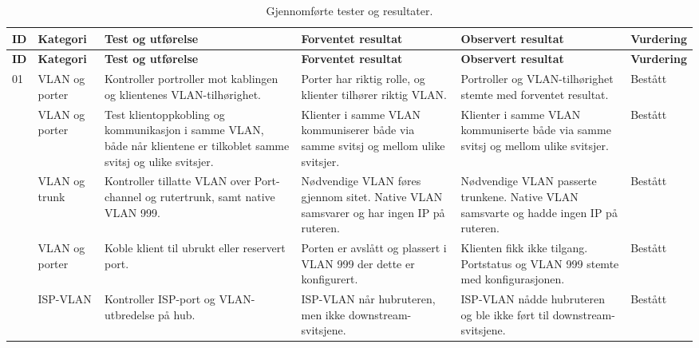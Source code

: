 \begin{longtable}{
>{\RaggedRight\arraybackslash}p{0.6cm}
>{\RaggedRight\arraybackslash}p{2cm}
>{\RaggedRight\arraybackslash}p{3.5cm}
>{\RaggedRight\arraybackslash}p{4cm}
>{\RaggedRight\arraybackslash}p{3.5cm}
>{\RaggedRight\arraybackslash}p{1.5cm}}
\caption{Gjennomførte tester og resultater.}
\label{tab:testmatrise}\\
\toprule
\rowcolor{tablegreen}
\color{white}\textbf{ID} &
\color{white}\textbf{Kategori} &
\color{white}\textbf{Test og utførelse} &
\color{white}\textbf{Forventet resultat} &
\color{white}\textbf{Observert resultat} &
\color{white}\textbf{Vurdering} \\
\midrule
\endfirsthead

\toprule
\rowcolor{tablegreen}
\color{white}\textbf{ID} &
\color{white}\textbf{Kategori} &
\color{white}\textbf{Test og utførelse} &
\color{white}\textbf{Forventet resultat} &
\color{white}\textbf{Observert resultat} &
\color{white}\textbf{Vurdering} \\
\midrule
\endhead

01 & VLAN og porter &
Kontroller portroller mot kablingen og klientenes VLAN-tilhørighet. &
Porter har riktig rolle, og klienter tilhører riktig VLAN. &
Portroller og VLAN-tilhørighet stemte med forventet resultat. & Bestått \\

02 & VLAN og porter &
Test klientoppkobling og kommunikasjon i samme VLAN, både når klientene er tilkoblet samme svitsj og ulike svitsjer. &
Klienter i samme VLAN kommuniserer både via samme svitsj og mellom ulike svitsjer. &
Klienter i samme VLAN kommuniserte både via samme svitsj og mellom ulike svitsjer. & Bestått \\

03 & VLAN og trunk &
Kontroller tillatte VLAN over Port-channel og rutertrunk, samt native VLAN 999. &
Nødvendige VLAN føres gjennom sitet. Native VLAN samsvarer og har ingen IP på ruteren. &
Nødvendige VLAN passerte trunkene. Native VLAN samsvarte og hadde ingen IP på ruteren. & Bestått \\

04 & VLAN og porter &
Koble klient til ubrukt eller reservert port. &
Porten er avslått og plassert i VLAN 999 der dette er konfigurert. &
Klienten fikk ikke tilgang. Portstatus og VLAN 999 stemte med konfigurasjonen. & Bestått \\

05 & ISP-VLAN &
Kontroller ISP-port og VLAN-utbredelse på hub. &
ISP-VLAN når hubruteren, men ikke downstream-svitsjene. &
ISP-VLAN nådde hubruteren og ble ikke ført til downstream-svitsjene. & Bestått \\


\end{longtable}
